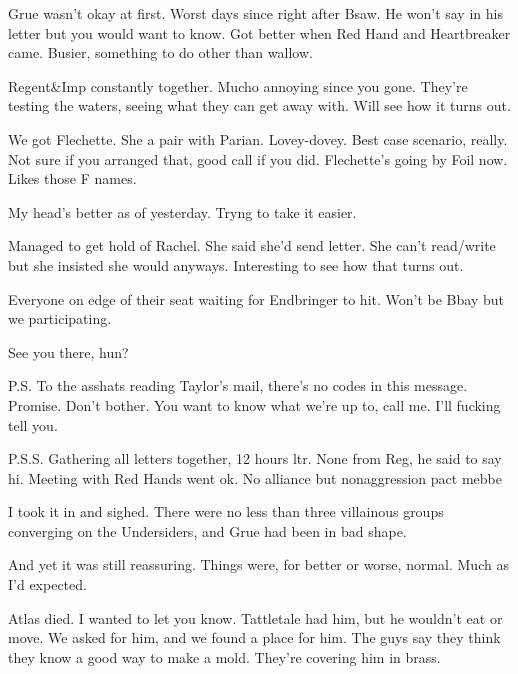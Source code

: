 Grue wasn't okay at first.  Worst days since right after Bsaw.  He won't say in his letter but you would want to know.  Got better when Red Hand and Heartbreaker came.  Busier, something to do other than wallow.



Regent&Imp constantly together.  Mucho annoying since you gone.  They're testing the waters, seeing what they can get away with.  Will see how it turns out.



We got Flechette.  She a pair with Parian.  Lovey-dovey.  Best case scenario, really.  Not sure if you arranged that, good call if you did.  Flechette's going by Foil now.  Likes those F names.



My head's better as of yesterday.  Tryng to take it easier.



Managed to get hold of Rachel.  She said she'd send letter.  She can't read/write but she insisted she would anyways.  Interesting to see how that turns out.



Everyone on edge of their seat waiting for Endbringer to hit.  Won't be Bbay but we participating.



See you there, hun?



P.S.  To the asshats reading Taylor's mail, there's no codes in this message.  Promise.  Don't bother.  You want to know what we're up to, call me.  I'll fucking tell you.



P.S.S.  Gathering all letters together, 12 hours ltr.  None from Reg, he said to say hi.  Meeting with Red Hands went ok.  No alliance but nonaggression pact mebbe



I took it in and sighed.  There were no less than three villainous groups converging on the Undersiders, and Grue had been in bad shape.



And yet it was still reassuring.  Things were, for better or worse, normal.  Much as I'd expected.



Atlas died.  I wanted to let you know.  Tattletale had him, but he wouldn't eat or move.  We asked for him, and we found a place for him.  The guys say they think they know a good way to make a mold.  They're covering him in brass.




